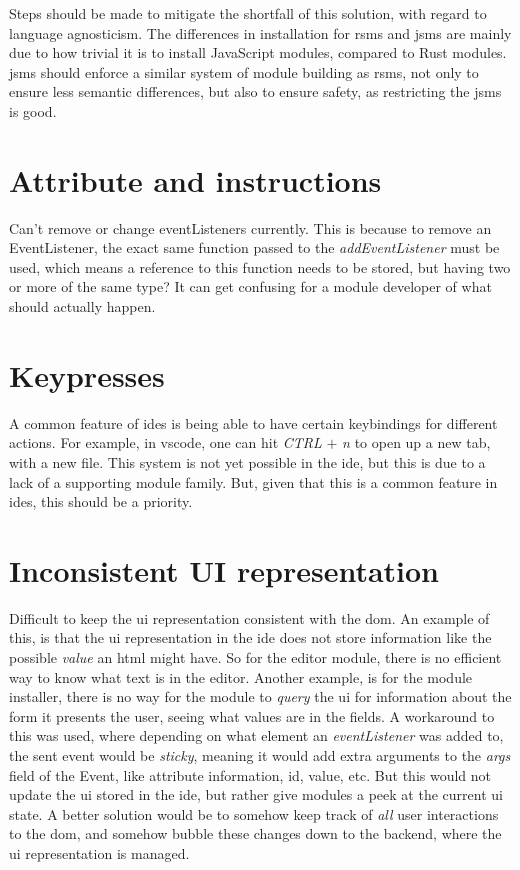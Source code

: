 Steps should be made to mitigate the shortfall of this solution, with regard to
language agnosticism. The differences in installation for \gls*{rsms} and
\gls*{jsms} are mainly due to how trivial it is to install JavaScript modules,
compared to Rust modules. \gls*{jsms} should enforce a similar system of module
building as \gls*{rsms}, not only to ensure less semantic differences, but also
to ensure safety, as restricting the \gls*{jsms} is good.

\section{Attribute and instructions}

Can't remove or change eventListeners currently. This is because to remove an
EventListener, the exact same function passed to the \textit{addEventListener}
must be used, which means a reference to this function needs to be stored, but
having two or more of the same type? It can get confusing for a module developer
of what should actually happen.

\section{Keypresses}

A common feature of \gls*{ide}s is being able to have certain keybindings for
different actions. For example, in \gls*{vscode}, one can hit \textit{CTRL}
$+$ \textit{n} to open up a new tab, with a new file. This system is not yet
possible in the \gls*{ide}, but this is due to a lack of a supporting module
family. But, given that this is a common feature in \gls*{ide}s, this should be
a priority.

\section{Inconsistent UI representation}

Difficult to keep the \gls*{ui} representation consistent with the \gls*{dom}.
An example of this, is that the \gls*{ui} representation in the \gls*{ide} does
not store information like the possible \textit{value} an \gls{html} might
have. So for the editor module, there is no efficient way to know what text is
in the editor. Another example, is for the module installer, there is no way for
the module to \textit{query} the \gls*{ui} for information about the form it
presents the user, seeing what values are in the fields. A workaround to this
was used, where depending on what element an \textit{eventListener} was added
to, the sent event would be \textit{sticky}, meaning it would add extra
arguments to the \textit{args} field of the Event, like attribute information,
id, value, etc. But this would not update the \gls*{ui} stored in the
\gls*{ide}, but rather give modules a peek at the current \gls*{ui} state. A
better solution would be to somehow keep track of \textit{all} user interactions
to the \gls*{dom}, and somehow bubble these changes down to the backend, where
the \gls*{ui} representation is managed.

